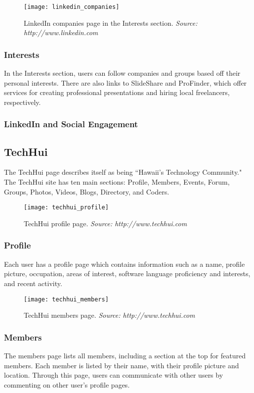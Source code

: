 \begin{figure}[h]
\centering
\texttt{[image: linkedin\_companies]}
\caption{LinkedIn companies page in the Interests section. \textit{Source: http://www.linkedin.com}}
\end{figure}
\subsubsection{Interests}
In the Interests section, users can follow companies and groups based off their personal interests. There are also links to SlideShare and ProFinder, which offer services for creating professional presentations and hiring local freelancers, respectively.

\subsubsection{LinkedIn and Social Engagement}

\subsection{TechHui}
The TechHui page describes itself as being ``Hawaii's Technology Community." The TechHui site has ten main sections: Profile, Members, Events, Forum, Groups, Photos, Videos, Blogs, Directory, and Coders.

\begin{figure}[h]
\centering
\texttt{[image: techhui\_profile]}
\caption{TechHui profile page. \textit{Source: http://www.techhui.com}}
\end{figure}
\subsubsection{Profile}
Each user has a profile page which contains information such as a name, profile picture, occupation, areas of interest, software language proficiency and interests, and recent activity.

\begin{figure}[h]
\centering
\texttt{[image: techhui\_members]}
\caption{TechHui members page. \textit{Source: http://www.techhui.com}}
\end{figure}
\subsubsection{Members}
The members page lists all members, including a section at the top for featured members. Each member is listed by their name, with their profile picture and location. Through this page, users can communicate with other users by commenting on other user's profile pages.

